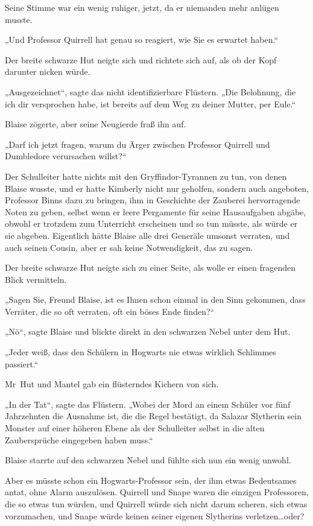 {Seine Stimme war ein wenig ruhiger, jetzt, da er niemanden mehr anlügen musste.

„Und Professor Quirrell hat genau so reagiert, wie Sie es erwartet haben.“

Der breite schwarze Hut neigte sich und richtete sich auf, als ob der Kopf darunter nicken würde.

„Ausgezeichnet“, sagte das nicht identifizierbare Flüstern. „Die Belohnung, die ich dir versprochen habe, ist bereits auf dem Weg zu deiner Mutter, per Eule.“

Blaise zögerte, aber seine Neugierde fraß ihn auf.

„Darf ich jetzt fragen, warum du Ärger zwischen Professor Quirrell und Dumbledore verursachen willst?“

Der Schulleiter hatte nichts mit den Gryffindor-Tyrannen zu tun, von denen Blaise wusste, und er hatte Kimberly nicht nur geholfen, sondern auch angeboten, Professor Binns dazu zu bringen, ihm in Geschichte der Zauberei hervorragende Noten zu geben, selbst wenn er leere Pergamente für seine Hausaufgaben abgäbe, obwohl er trotzdem zum Unterricht erscheinen und so tun müsste, als würde er sie abgeben. Eigentlich hätte Blaise alle drei Generäle umsonst verraten, und auch seinen Cousin, aber er sah keine Notwendigkeit, das zu sagen.

Der breite schwarze Hut neigte sich zu einer Seite, als wolle er einen fragenden Blick vermitteln.

„Sagen Sie, Freund Blaise, ist es Ihnen schon einmal in den Sinn gekommen, dass Verräter, die so oft verraten, oft ein böses Ende finden?“

„Nö“, sagte Blaise und blickte direkt in den schwarzen Nebel unter dem Hut.

„Jeder weiß, dass den Schülern in Hogwarts nie etwas wirklich Schlimmes passiert.“

Mr~Hut und Mantel gab ein flüsterndes Kichern von sich.

„In der Tat“, sagte das Flüstern. „Wobei der Mord an einem Schüler vor fünf Jahrzehnten die Ausnahme ist, die die Regel bestätigt, da Salazar Slytherin sein Monster auf einer höheren Ebene als der Schulleiter selbst in die alten Zaubersprüche eingegeben haben muss.“

Blaise starrte auf den schwarzen Nebel und fühlte sich nun ein wenig unwohl.

Aber es müsste schon ein Hogwarts-Professor sein, der ihm etwas Bedeutsames antat, ohne Alarm auszulösen. Quirrell und Snape waren die einzigen Professoren, die so etwas tun würden, und Quirrell würde sich nicht darum scheren, sich etwas vorzumachen, und Snape würde keinen seiner eigenen Slytherins verletzen…oder?

}
